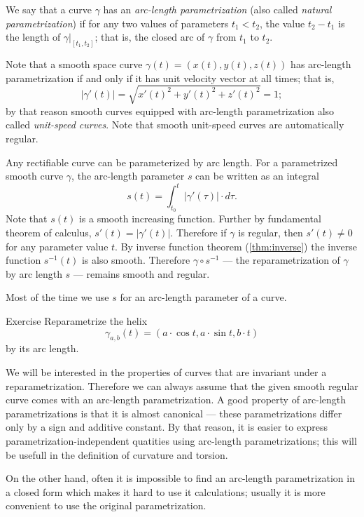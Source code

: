 We say that a curve $\gamma$ has an \emph{arc-length parametrization} (also called \emph{natural parametrization})
if for any two values of parameters $t_1<t_2$, the value $t_2-t_1$ is the length of $\gamma|_{[t_1,t_2]}$; that is, the closed arc of $\gamma$ from $t_1$ to $t_2$.

Note that a smooth space curve $\gamma(t)=(x(t),y(t),z(t))$ has arc-length parametrization if and only if it has unit velocity vector at all times;
that is, 
\[|\gamma'(t)|=\sqrt{x'(t)^2+y'(t)^2+z'(t)^2}=1;\]
by that reason smooth curves equipped with arc-length parametrization also called \emph{unit-speed curves}.
Note that smooth unit-speed curves are automatically regular.


Any rectifiable curve can be parameterized by arc length.
For a parametrized smooth curve $\gamma$, the arc-length parameter $s$ can be written as an integral
\[s(t)=\int_{t_0}^t |\gamma'(\tau)|\cdot d\tau.\] %
Note that $s(t)$ is a smooth increasing function.
Further by fundamental theorem of calculus, $s'(t)=|\gamma'(t)|$.
Therefore if $\gamma$ is regular, then $s'(t)\ne0$ for any parameter value $t$.
By inverse function theorem (\ref{thm:inverse}) the inverse function $s^{-1}(t)$ is also smooth.
Therefore $\gamma\circ s^{-1}$ --- the reparametrization  of $\gamma$ by arc length  $s$ --- remains smooth and regular.

Most of the time we use $s$ for an arc-length parameter of a curve.

\begin{thm}{Exercise}\label{ex:arc-length-helix}
Reparametrize the helix 
\[\gamma_{a,b}(t)=(a\cdot\cos t,a\cdot \sin t, b\cdot t)\]
by its arc length.
\end{thm}

We will be interested in the properties of curves that are invariant under a reparametrization.
Therefore we can always assume that the given smooth regular curve comes with an arc-length parametrization.
A good property of arc-length parametrizations is that it is almost canonical --- these parametrizations differ only by a sign and additive constant.
By that reason, it is easier to express parametrization-independent quatities using arc-length parametrizations;
this will be usefull in the definition of curvature and torsion.

On the other hand, often it is impossible to find an arc-length parametrization in a closed form which makes it hard to use it calculations;
usually it is more convenient to use the original parametrization.

